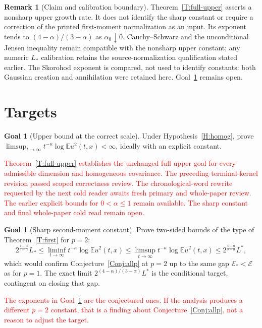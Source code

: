 \documentclass[12pt]{article}
\numberwithin{equation}{section}
\theoremstyle{definition}
\newtheorem{remark}[theorem]{Remark}
\newtheorem{goal}[theorem]{Goal}
\newcommand{\E}{\mathbb{E}}
\newcommand{\cE}{\mathcal{E}}
\newcommand{\myCmts}[1]{\begin{framed}\noindent\textcolor{red}{#1}\end{framed}}
\begin{document}
\begin{remark}[Claim and calibration boundary]\label{R:full-upper-boundary}
  Theorem~\ref{T:full-upper} asserts a nonsharp upper growth rate.
  It does not identify the sharp constant or require a correction of the
  printed first-moment normalization as an input.
  Its exponent tends to $(4-\alpha)/(3-\alpha)$ as $\alpha_0\downarrow0$.
  Cauchy--Schwarz and the unconditional Jensen inequality remain compatible
  with the nonsharp upper constant; any numeric $L_*$ calibration retains
  the source-normalization qualification stated earlier.
  The Skorohod exponent is compared, not used to identify constants:
  both Gaussian creation and annihilation were retained here.
  Goal~\ref{G:sharp} remains open.
\end{remark}


\section{Targets}\label{S:targets}

\begin{goal}[Upper bound at the correct scale]\label{G:upper}
  Under Hypothesis~\ref{H:homog}, prove
  $\limsup_{t\to\infty}t^{-\kappa}\log\E u^2(t,x)<\infty$, ideally with an
  explicit constant.
\end{goal}

\myCmts{Theorem~\ref{T:full-upper} establishes the unchanged full upper
goal for every admissible dimension and homogeneous covariance.
The preceding terminal-kernel revision passed scoped correctness review.
The chronological-word rewrite requested by the next cold reader awaits
fresh primary and whole-paper review.
The earlier explicit bounds for $0<\alpha\le1$ remain available.
The sharp constant and final whole-paper cold read remain open.}

\begin{goal}[Sharp second-moment constant]\label{G:sharp}
  Prove two-sided bounds of the type of Theorem~\ref{T:first} for $p=2$:
  \[
    2^{\frac{4-\alpha}{3-\alpha}}L_*
    \le\liminf_{t\to\infty}t^{-\kappa}\log\E u^2(t,x)
    \le\limsup_{t\to\infty}t^{-\kappa}\log\E u^2(t,x)
    \le2^{\frac{4-\alpha}{3-\alpha}}L^*,
  \]
  which would confirm Conjecture~\ref{Conj:allp} at $p=2$ up to the same gap
  $\cE_*<\cE$ as for $p=1$. The exact limit
  $2^{(4-\alpha)/(3-\alpha)}L^*$ is the conditional target, contingent on
  closing that gap.
\end{goal}

\myCmts{The exponents in Goal~\ref{G:sharp} are the conjectured ones. If
the analysis produces a different $p=2$ constant, that is a finding about
Conjecture~\ref{Conj:allp}, not a reason to adjust the target.}
\end{document}
